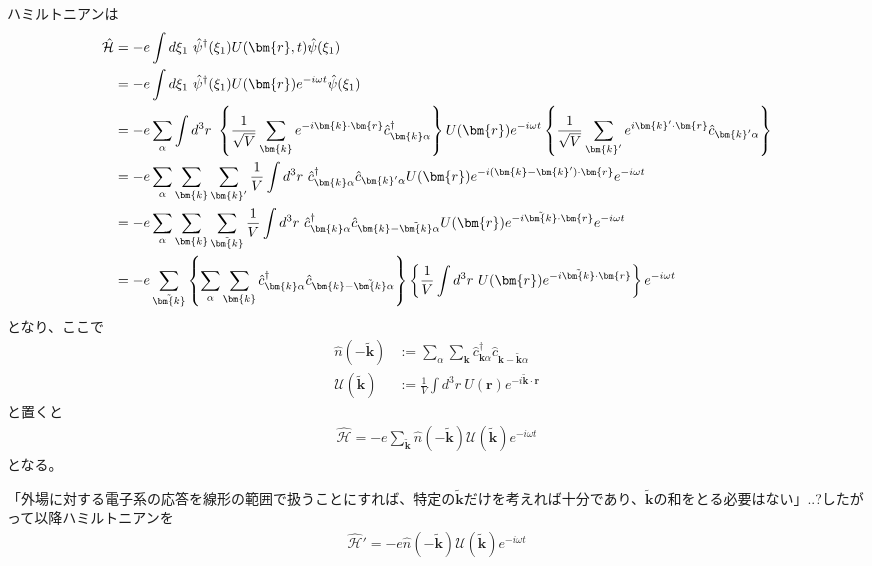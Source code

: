 \documentclass[dvipdfmx, 11pt, a4paper]{jsarticle}
\numberwithin{equation}{section}
\theoremstyle{definition}
\begin{document}
    \begin{derivationBox}
        ハミルトニアンは
        \begin{align}
            \hat{\mathcal{H}} &= -e\int d \xi_1\ \hat{\psi}^\dagger(\xi_1) U(\bm{r},t) \hat{\psi}(\xi_1) \notag \\
            &= -e\int d \xi_1\ \hat{\psi}^\dagger(\xi_1) U(\bm{r})e^{-i\omega t}\hat{\psi}(\xi_1) \notag \\
            &= -e\sum_{\alpha}\int d^3r\ \left\{ \frac{1}{\sqrt{V}} \sum_{\bm{k}}e^{-i\bm{k}\cdot\bm{r}} \hat{c}_{\bm{k}\alpha}^\dagger  \right\} U(\bm{r})e^{-i\omega t}\left\{ \frac{1}{\sqrt{V}}\sum_{\bm{k}'}e^{i\bm{k}'\cdot\bm{r}}\hat{c}_{\bm{k}'\alpha} \right\} \notag \\
            &= -e\sum_{\alpha}\sum_{\bm{k}}\sum_{\bm{k}'} \frac{1}{V} \int d^3r\ \hat{c}_{\bm{k}\alpha}^\dagger \hat{c}_{\bm{k}'\alpha} U(\bm{r}) e^{-i(\bm{k} - \bm{k}')\cdot \bm{r}} e^{-i\omega t} \notag \\
            &= -e\sum_{\alpha}\sum_{\bm{k}}\sum_{\tilde{\bm{k}}} \frac{1}{V} \int d^3r\ \hat{c}_{\bm{k}\alpha}^\dagger \hat{c}_{\bm{k} - \tilde{\bm{k}} \alpha} U(\bm{r}) e^{-i\tilde{\bm{k}}\cdot \bm{r}} e^{-i\omega t} \notag \\
            &= -e\sum_{\tilde{\bm{k}}} \left\{ \sum_{\alpha}\sum_{\bm{k}} \hat{c}_{\bm{k}\alpha}^\dagger \hat{c}_{\bm{k} - \tilde{\bm{k}} \alpha}  \right\} \left\{  \frac{1}{V} \int d^3r\ U(\bm{r}) e^{-i\tilde{\bm{k}}\cdot \bm{r}}  \right\} e^{-i\omega t}
        \end{align}
        となり、ここで
        \begin{align}
            \hat{n}(-\tilde{\bm{k}}) &:= \sum_{\alpha}\sum_{\bm{k}} \hat{c}_{\bm{k}\alpha}^\dagger \hat{c}_{\bm{k} - \tilde{\bm{k}} \alpha}  \\
            \mathcal{U}(\tilde{\bm{k}}) &:= \frac{1}{V} \int d^3r\ U(\bm{r}) e^{-i\tilde{\bm{k}}\cdot \bm{r}}
        \end{align}
        と置くと
        \begin{align}
            \hat{\mathcal{H}} = -e\sum_{\tilde{\bm{k}}} \hat{n}(-\tilde{\bm{k}}) \mathcal{U}(\tilde{\bm{k}})e^{-i\omega t}
        \end{align}
        となる。
    \end{derivationBox}
    「外場に対する電子系の応答を線形の範囲で扱うことにすれば、特定の$\tilde{\bm{k}}$だけを考えれば十分であり、$\tilde{\bm{k}}$の和をとる必要はない」..?したがって以降ハミルトニアンを
    \begin{align}
        \hat{\mathcal{H}}' = -e \hat{n}(-\tilde{\bm{k}}) \mathcal{U}(\tilde{\bm{k}})e^{-i\omega t}
    \end{align}
\end{document}
